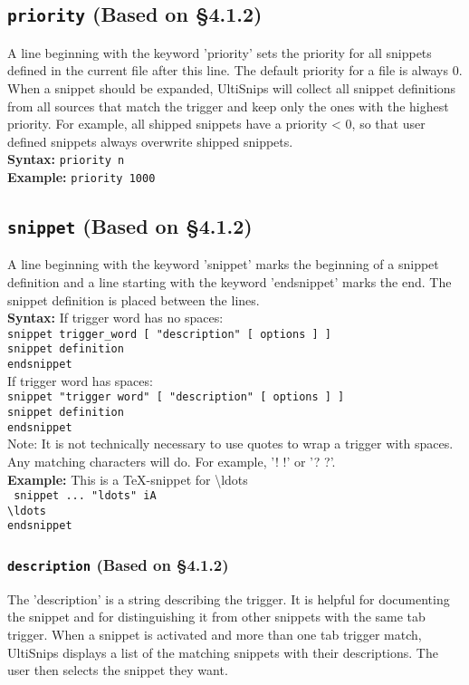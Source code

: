 \documentclass[11pt]{article}
\theoremstyle{plain}%
\theoremstyle{definition}
\theoremstyle{remark}
\begin{document}
	\subsection{\texttt{priority} (Based on \S4.1.2)}
	A line beginning with the keyword 'priority' sets the priority for all snippets defined in the current file after this line. The default priority for a file is always 0. When a snippet should be expanded, UltiSnips will collect all snippet definitions from all sources that match the trigger and keep only the ones with the highest priority. For example, all shipped snippets have a priority < 0, so that user defined snippets always overwrite shipped snippets.\\
	\textbf{Syntax:} \texttt{priority n}\\
	\textbf{Example:} \texttt{priority 1000}

	\subsection{\texttt{snippet} (Based on \S4.1.2)}
	A line beginning with the keyword 'snippet' marks the beginning of a snippet definition and a line starting with  the keyword 'endsnippet' marks the end. The snippet definition is placed between the lines.\\
	\textbf{Syntax:} If trigger word has no spaces: \\ \texttt{snippet trigger\_word [ "description" [ options ] ] \\
	snippet definition\\
	endsnippet}\\
	If trigger word has spaces: \\ \texttt{snippet "trigger word" [ "description" [ options ] ]\\
	snippet definition\\
	endsnippet}\\
	Note: It is not technically necessary to use quotes to wrap a trigger with spaces. Any matching characters will do. For example, '! !' or '? ?'. \\	
	\textbf{Example:} This is a \TeX-snippet for \textbackslash ldots\\ 
	\texttt{
	snippet ... "ldots" iA \\
	\textbackslash ldots \\
	endsnippet}
	\subsubsection{\texttt{description} (Based on \S4.1.2)}
	The 'description' is a string describing the trigger. It is helpful for documenting the snippet and for distinguishing it from other snippets with the same tab trigger. When a snippet is activated and more than one tab trigger match, UltiSnips displays a list of the matching snippets with their descriptions. The user then selects the snippet they want.
\end{document}
